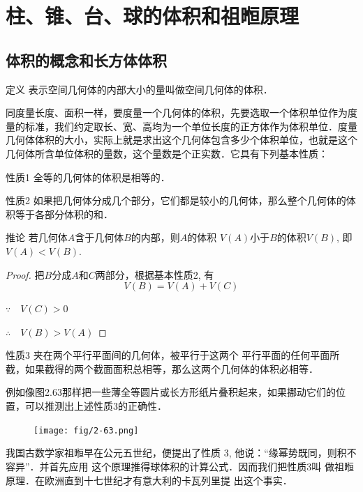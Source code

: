 \section{柱、锥、台、球的体积和祖暅原理}

\subsection{体积的概念和长方体体积}
\begin{blk}
    {定义} 表示空间几何体的内部大小的量叫做空间几何体的体积．
\end{blk}

同度量长度、面积一样，要度量一个几何体的体积，先要选取一个体积单位作为度量的标准，我们约定取长、宽、高均为一个单位长度的正方体作为体积单位．度量几何体体积的大小，实际上就是求出这个几何体包含多少个体积单位，也就是这个几何体所含单位体积的量数，这个量数是个正实数．它具有下列基本性质：

\begin{blk}{性质1}
    全等的几何体的体积是相等的．
\end{blk}


\begin{blk}{性质2}
    如果把几何体分成几个部分，它们都是较小的几何体，那么整个几何体的体积等于各部分体积的和．
\end{blk}

\begin{blk}
  {推论} 若几何体$A$含于几何体$B$的内部，则$A$的体积
$V(A)$小于$B$的体积$V(B)$, 即$V(A)<V(B)$.  
\end{blk}

\begin{proof}
 把$B$分成$A$和$C$两部分，根据基本性质2, 有
\[V(B)=V(A)+V(C)\]

$\because\quad V (C) > 0$

$\therefore\quad  V (B) > V (A)$   
\end{proof}

\begin{blk}{性质3}
    夹在两个平行平面间的几何体，被平行于这两个
平行平面的任何平面所截，如果截得的两个截面面积总相等，那么这两个几何体的体积必相等．
\end{blk}

例如像图2.63那样把一些薄全等圆片或长方形纸片叠积起来，如果挪动它们的位置，可以推测出上述性质3的正确性．
\begin{figure}[htp]
    \centering
\texttt{[image: fig/2-63.png]}
    \caption{}
\end{figure}

我国古数学家祖暅早在公元五世纪，便提出了性质
3, 他说：“缘幂势既同，则积不容异”．并首先应用
这个原理推得球体积的计算公式．因而我们把性质3叫
做祖暅原理．在欧洲直到十七世纪才有意大利的卡瓦列里提
出这个事实．

